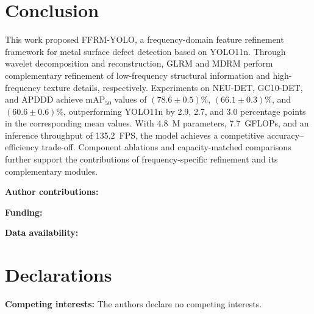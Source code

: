 \documentclass[pdflatex,sn-nature]{sn-jnl}
\begin{document}
\section{Conclusion}
\label{sec:conclusion}
This work proposed FFRM-YOLO, a frequency-domain feature refinement framework for metal surface defect detection based on YOLO11n. Through wavelet decomposition and reconstruction, GLRM and MDRM perform complementary refinement of low-frequency structural information and high-frequency texture details, respectively. Experiments on NEU-DET, GC10-DET, and APDDD achieve $\mathrm{mAP}_{50}$ values of $(78.6 \pm 0.5)\%$, $(66.1 \pm 0.3)\%$, and $(60.6 \pm 0.6)\%$, outperforming YOLO11n by 2.9, 2.7, and 3.0 percentage points in the corresponding mean values. With 4.8~M parameters, 7.7~GFLOPs, and an inference throughput of 135.2~FPS, the model achieves a competitive accuracy--efficiency trade-off. Component ablations and capacity-matched comparisons further support the contributions of frequency-specific refinement and its complementary modules.

\backmatter

\vspace{0.8em}

\noindent\textbf{Author contributions:}\quad


\vspace{0.8em}

\noindent\textbf{Funding:}\quad


\vspace{0.8em}

\noindent\textbf{Data availability:}\quad


\section*{Declarations}

\noindent\textbf{Competing interests:}\quad
The authors declare no competing interests.


\end{document}
